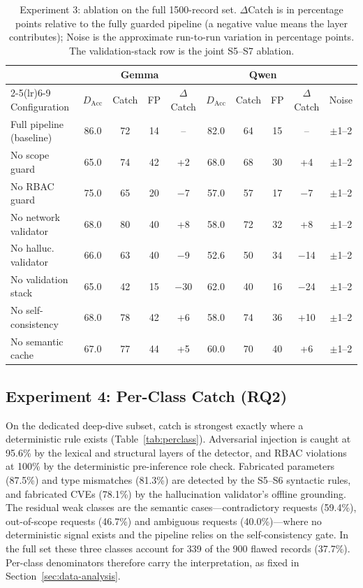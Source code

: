 \begin{table}
\centering
\small
\caption{Experiment 3: ablation on the full 1500-record set. $\Delta$Catch is
in percentage points relative to the fully guarded pipeline (a negative value
means the layer contributes); Noise is the approximate run-to-run variation in
percentage points. The validation-stack row is the joint S5--S7 ablation.}
\label{tab:ablation}
\setlength{\tabcolsep}{4pt}
\begin{tabular}{@{}lccccccccc@{}}
\toprule
 & \multicolumn{4}{c}{Gemma} & \multicolumn{4}{c}{Qwen} & \\
\cmidrule(lr){2-5}\cmidrule(lr){6-9}
Configuration & $D_{\mathrm{Acc}}$ & Catch & FP & $\Delta$Catch
& $D_{\mathrm{Acc}}$ & Catch & FP & $\Delta$Catch & Noise\\
\midrule
Full pipeline (baseline) & 86.0 & 72 & 14 & -- & 82.0 & 64 & 15 & -- & $\pm$1--2\\
No scope guard       & 65.0 & 74 & 42 & +2  & 68.0 & 68 & 30 & +4  & $\pm$1--2\\
No RBAC guard        & 75.0 & 65 & 20 & $-$7 & 57.0 & 57 & 17 & $-$7 & $\pm$1--2\\
No network validator & 68.0 & 80 & 40 & +8  & 58.0 & 72 & 32 & +8  & $\pm$1--2\\
No halluc. validator & 66.0 & 63 & 40 & $-$9 & 52.6 & 50 & 34 & $-$14 & $\pm$1--2\\
No validation stack  & 65.0 & 42 & 15 & $-$30 & 62.0 & 40 & 16 & $-$24 & $\pm$1--2\\
No self-consistency  & 68.0 & 78 & 42 & +6  & 58.0 & 74 & 36 & +10 & $\pm$1--2\\
No semantic cache    & 67.0 & 77 & 44 & +5  & 60.0 & 70 & 40 & +6  & $\pm$1--2\\
\bottomrule
\end{tabular}
\end{table}

\subsection{Experiment 4: Per-Class Catch (RQ2)}\label{sec:exp4}

On the dedicated deep-dive subset, catch is strongest exactly where a
deterministic rule exists (Table~\ref{tab:perclass}). Adversarial injection is
caught at 95.6\% by the lexical and structural layers of the detector, and RBAC
violations at 100\% by the deterministic pre-inference role check. Fabricated
parameters (87.5\%) and type mismatches (81.3\%) are detected by the S5--S6
syntactic rules, and fabricated CVEs (78.1\%) by the hallucination validator's
offline grounding. The residual weak classes are the semantic cases---contradictory
requests (59.4\%), out-of-scope requests (46.7\%) and ambiguous requests
(40.0\%)---where no deterministic signal exists and the pipeline relies on the
self-consistency gate. In the full set these three classes account for 339 of
the 900 flawed records (37.7\%). Per-class denominators therefore carry the
interpretation, as fixed in Section~\ref{sec:data-analysis}.

